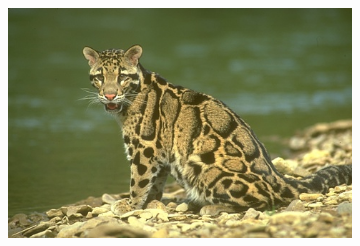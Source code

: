 \documentclass[journal]{IEEEtran}
\begin{document}
\begin{figure}[!t]
         
    \begin{subfigure}[b]{\textwidth+20pt\relax}
    	\centering
    	\includegraphics[width=\dimexpr\linewidth-20pt\relax]{160067} 
    \end{subfigure}  \\ \vspace{-5pt}    
    

\end{figure}
\end{document}
